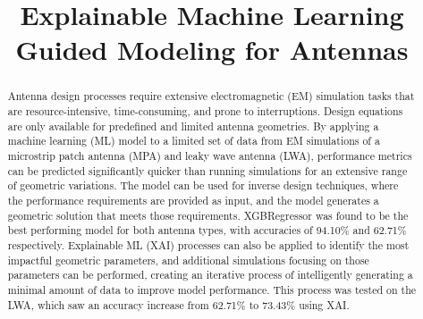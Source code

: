 \documentclass[conference]{IEEEtran}
\begin{document}
\title{Explainable Machine Learning Guided Modeling for Antennas\\
}

\author{
\and
{}
\and
{}
\and
{}
}

\maketitle

\begin{abstract}
    Antenna design processes require extensive electromagnetic (EM) simulation tasks that are resource-intensive, time-consuming, and prone to interruptions. Design equations are only available for predefined and limited antenna geometries. By applying a machine learning (ML) model to a limited set of data from EM simulations of a microstrip patch antenna (MPA) and leaky wave antenna (LWA), performance metrics can be predicted significantly quicker than running simulations for an extensive range of geometric variations. The model can be used for inverse design techniques, where the performance requirements are provided as input, and the model generates a geometric solution that meets those requirements. XGBRegressor was found to be the best performing model for both antenna types, with accuracies of 94.10\% and 62.71\% respectively. Explainable ML (XAI) processes can also be applied to identify the most impactful geometric parameters, and additional simulations focusing on those parameters can be performed, creating an iterative process of intelligently generating a minimal amount of data to improve model performance. This process was tested on the LWA, which saw an accuracy increase from 62.71\% to 73.43\% using XAI. 
\end{abstract}
\end{document}
